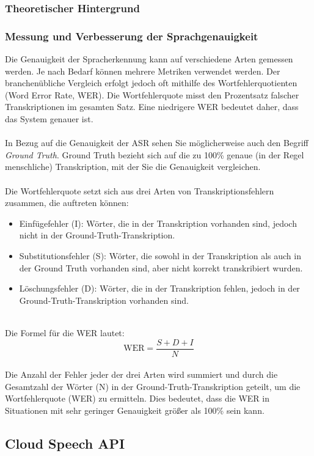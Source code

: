 \documentclass[12pt,a4paper]{article}
\begin{document}
\subsubsection{Theoretischer Hintergrund}
\subsubsection{Messung und Verbesserung der Sprachgenauigkeit}
Die Genauigkeit der Spracherkennung kann auf verschiedene Arten gemessen werden. Je nach Bedarf können mehrere Metriken verwendet werden. Der branchenübliche Vergleich erfolgt jedoch oft mithilfe des Wortfehlerquotienten (Word Error Rate, WER). Die Wortfehlerquote misst den Prozentsatz falscher Transkriptionen im gesamten Satz. Eine niedrigere WER bedeutet daher, dass das System genauer ist.
\\ \\
In Bezug auf die Genauigkeit der ASR sehen Sie möglicherweise auch den Begriff \textit{Ground Truth}. Ground Truth bezieht sich auf die zu 100\% genaue (in der Regel menschliche) Transkription, mit der Sie die Genauigkeit vergleichen.
\\ \\
Die Wortfehlerquote setzt sich aus drei Arten von Transkriptionsfehlern zusammen, die auftreten können:

\begin{itemize}
	\item Einfügefehler (I): Wörter, die in der Transkription vorhanden sind, jedoch nicht in der Ground-Truth-Transkription.
	\item Substitutionsfehler (S): Wörter, die sowohl in der Transkription als auch in der Ground Truth vorhanden sind, aber nicht korrekt transkribiert wurden.
	\item Löschungsfehler (D): Wörter, die in der Transkription fehlen, jedoch in der Ground-Truth-Transkription vorhanden sind.
\end{itemize}
\ \\
Die Formel für die WER lautet: 
\[ \text{WER} = \frac{S + D + I}{N} \]
\\
Die Anzahl der Fehler jeder der drei Arten wird summiert und durch die Gesamtzahl der Wörter (N) in der Ground-Truth-Transkription geteilt, um die Wortfehlerquote (WER) zu ermitteln. Dies bedeutet, dass die WER in Situationen mit sehr geringer Genauigkeit größer als 100\% sein kann.
\ \\

\subsection{Cloud Speech API}
\end{document}

